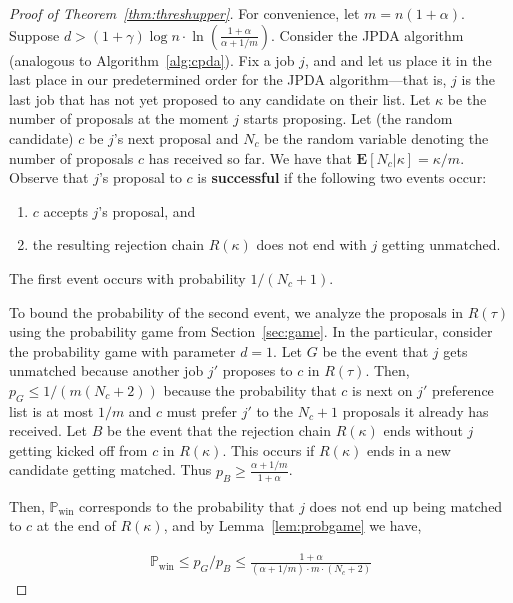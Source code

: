 \documentclass[11pt]{amsart}
\newcommand{\defn}{\textbf}
\begin{document}
\begin{proof}[Proof of Theorem~\ref{thm:threshupper}]

For convenience, let $m = n(1 + \alpha)$. Suppose $d > (1+\gamma) \log n \cdot \ln \left( \frac {1+\alpha}{\alpha + 1/m} \right)$.  Consider the JPDA algorithm (analogous to Algorithm~\ref{alg:cpda}).  Fix a job $j$, and and let us place it in the last place in our predetermined order for the JPDA algorithm---that is, $j$ is the last job that has not yet proposed to any candidate on their list. Let $\kappa$ be the number of proposals at the moment $j$ starts proposing.  Let (the random candidate) $c$ be $j$'s next proposal and $N_c$ be the random variable denoting the number of proposals $c$ has received so far. We have that $\mathbf{E}[N_c|\kappa] = \kappa/m$. Observe that $j$'s proposal to $c$ is \defn{successful} if the following two events occur:
\begin{enumerate}
    \item $c$ accepts $j$'s proposal, and 
    \item the resulting rejection chain $R(\kappa)$ does not end with $j$ getting unmatched.
\end{enumerate} 

The first event occurs with probability $1/(N_c+1)$.  

To bound the probability of the second event, we analyze the proposals in $R(\tau)$ using the probability game from Section~\ref{sec:game}. In the particular, consider the probability game with parameter $d = 1$. Let $G$ be the event that $j$ gets unmatched because another job $j'$ proposes to $c$ in $R(\tau)$.  Then, $p_G \leq 1/(m(N_c +2))$ because the probability that $c$ is next on $j'$ preference list is at most $1/m$ and $c$ must prefer $j'$ to the $N_c + 1$ proposals it already has received.  Let $B$ be the event that the rejection chain $R(\kappa)$ ends without $j$ getting kicked off from $c$ in $R(\kappa)$.  This occurs if $R(\kappa)$ ends in a new candidate getting matched.  Thus $p_B \geq \frac{\alpha + 1/m}{1+\alpha}$. 


Then, $\mathbb{P}_{\text{win}}$ corresponds to the probability that $j$ does not end up being matched to $c$ at the end of $R(\kappa)$, and by Lemma~\ref{lem:probgame} we have,

\begin{align}
    \mathbb{P}_{\text{win}} \leq p_G/p_B \leq \frac{1+\alpha}{(\alpha + 1/m) \cdot m \cdot (N_c+2)} 
\end{align}



\end{proof}
\end{document}

